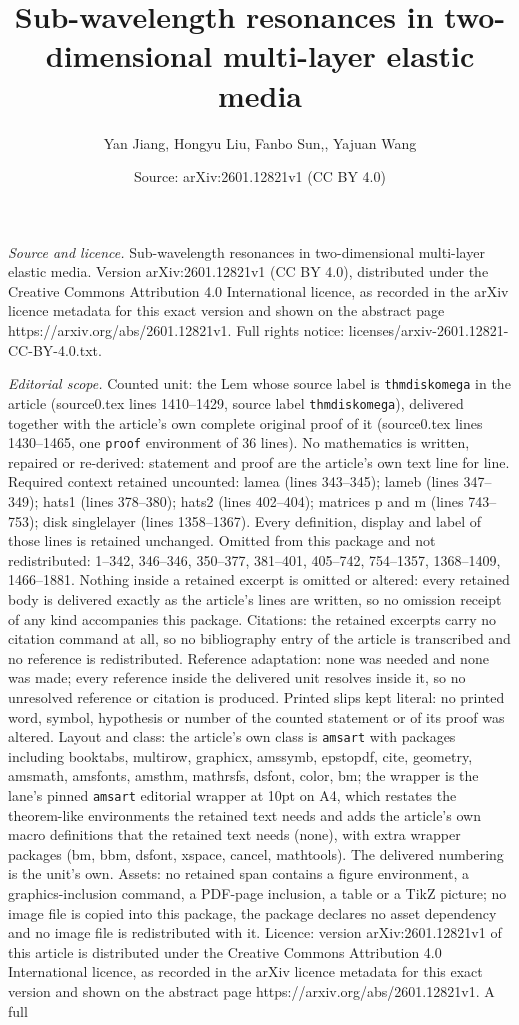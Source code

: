\documentclass[10pt,a4paper]{amsart}
\title[Sub-wavelength resonances in two-dimensional multi-layer ela]{Sub-wavelength resonances in two-dimensional multi-layer elastic media}
\author{Yan Jiang, Hongyu Liu, Fanbo Sun,, Yajuan Wang}
\date{Source: arXiv:2601.12821v1 (CC BY 4.0)}
\begin{document}
\maketitle

\noindent\emph{Source and licence.} Sub-wavelength resonances in two-dimensional multi-layer elastic media. Version arXiv:2601.12821v1 (CC BY 4.0), distributed under the Creative Commons Attribution 4.0 International licence, as recorded in the arXiv licence metadata for this exact version and shown on the abstract page https://arxiv.org/abs/2601.12821v1. Full rights notice: licenses/arxiv-2601.12821-CC-BY-4.0.txt.\par\smallskip

\noindent\textit{Editorial scope.} Counted unit: the Lem whose source label is \texttt{thmdiskomega} in the article (source0.tex lines 1410--1429, source label \texttt{thmdiskomega}), delivered together with the article's own complete original proof of it (source0.tex lines 1430--1465, one \texttt{proof} environment of 36 lines). No mathematics is written, repaired or re-derived: statement and proof are the article's own text line for line. Required context retained uncounted: lamea (lines 343--345); lameb (lines 347--349); hats1 (lines 378--380); hats2 (lines 402--404); matrices p and m (lines 743--753); disk singlelayer (lines 1358--1367). Every definition, display and label of those lines is retained unchanged. Omitted from this package and not redistributed: 1--342, 346--346, 350--377, 381--401, 405--742, 754--1357, 1368--1409, 1466--1881. Nothing inside a retained excerpt is omitted or altered: every retained body is delivered exactly as the article's lines are written, so no omission receipt of any kind accompanies this package. Citations: the retained excerpts carry no citation command at all, so no bibliography entry of the article is transcribed and no reference is redistributed. Reference adaptation: none was needed and none was made; every reference inside the delivered unit resolves inside it, so no unresolved reference or citation is produced. Printed slips kept literal: no printed word, symbol, hypothesis or number of the counted statement or of its proof was altered. Layout and class: the article's own class is \texttt{amsart} with packages including booktabs, multirow, graphicx, amssymb, epstopdf, cite, geometry, amsmath, amsfonts, amsthm, mathrsfs, dsfont, color, bm; the wrapper is the lane's pinned \texttt{amsart} editorial wrapper at 10pt on A4, which restates the theorem-like environments the retained text needs and adds the article's own macro definitions that the retained text needs (none), with extra wrapper packages (bm, bbm, dsfont, xspace, cancel, mathtools). The delivered numbering is the unit's own. Assets: no retained span contains a figure environment, a graphics-inclusion command, a PDF-page inclusion, a table or a TikZ picture; no image file is copied into this package, the package declares no asset dependency and no image file is redistributed with it. Licence: version arXiv:2601.12821v1 of this article is distributed under the Creative Commons Attribution 4.0 International licence, as recorded in the arXiv licence metadata for this exact version and shown on the abstract page https://arxiv.org/abs/2601.12821v1. A full 
\end{document}
